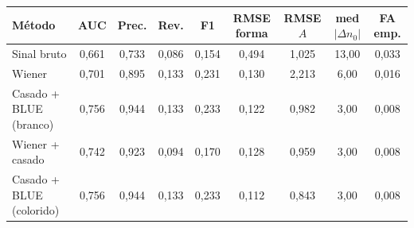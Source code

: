\begin{tabular}{lcccccccc}
\toprule
Método & AUC & Prec. & Rev. & F1 & RMSE forma & RMSE $A$ & med$|\Delta n_0|$ & FA emp. \\
\midrule
Sinal bruto & 0{,}661 & 0{,}733 & 0{,}086 & 0{,}154 & 0{,}494 & 1{,}025 & 13{,}00 & 0{,}033 \\
Wiener & 0{,}701 & 0{,}895 & 0{,}133 & 0{,}231 & 0{,}130 & 2{,}213 & 6{,}00 & 0{,}016 \\
Casado + BLUE (branco) & 0{,}756 & 0{,}944 & 0{,}133 & 0{,}233 & 0{,}122 & 0{,}982 & 3{,}00 & 0{,}008 \\
Wiener + casado & 0{,}742 & 0{,}923 & 0{,}094 & 0{,}170 & 0{,}128 & 0{,}959 & 3{,}00 & 0{,}008 \\
Casado + BLUE (colorido) & 0{,}756 & 0{,}944 & 0{,}133 & 0{,}233 & 0{,}112 & 0{,}843 & 3{,}00 & 0{,}008 \\
\bottomrule
\end{tabular}
